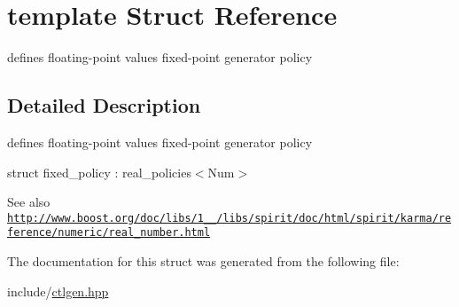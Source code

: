 \hypertarget{structtemplate}{
\section{template \-Struct \-Reference}
\label{structtemplate}
}


defines floating-\/point values fixed-\/point generator policy  




\subsection{\-Detailed \-Description}
defines floating-\/point values fixed-\/point generator policy 

struct fixed\-\_\-policy \-: real\-\_\-policies$<$\-Num$>$ \begin{DoxySeeAlso}{\-See also}
\href{http://www.boost.org/doc/libs/1_41_0/libs/spirit/doc/html/spirit/karma/reference/numeric/real_number.html}{\tt http\-://www.\-boost.\-org/doc/libs/1\-\_\-\_/libs/spirit/doc/html/spirit/karma/reference/numeric/real\-\_\-number.\-html} 
\end{DoxySeeAlso}


\-The documentation for this struct was generated from the following file\-:\begin{DoxyCompactItemize}
\item 
include/\hyperlink{ctlgen_8hpp}{ctlgen.\-hpp}\end{DoxyCompactItemize}
